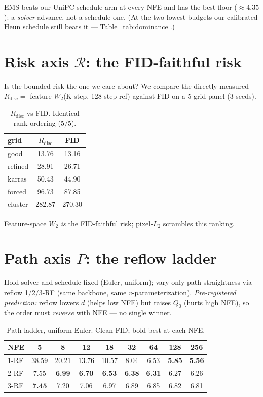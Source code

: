 \documentclass[11pt]{article}
\newcommand{\R}{\mathcal R}
\begin{document}
\noindent EMS beats our UniPC-schedule arm at every NFE and has the best floor
($\approx4.35$): a \emph{solver} advance, not a schedule one. (At the two
lowest budgets our calibrated Heun schedule still beats it ---
Table~\ref{tab:dominance}.)

\section{Risk axis $\R$: the FID-faithful risk}
\label{sec:risk}
Is the bounded risk the one we care about? We compare the directly-measured
$R_{\mathrm{disc}}=$ feature-$W_2$(K-step, 128-step ref) against FID on a
5-grid panel (3 seeds).

\begin{table}[h]\centering
\caption{$R_{\mathrm{disc}}$ vs FID. Identical rank ordering ($5/5$).}
\label{tab:risk}
\begin{tabular}{lcc}
\toprule
grid & $R_{\mathrm{disc}}$ & FID\\
\midrule
good    & 13.76  & 13.16\\
refined & 28.91  & 26.71\\
karras  & 50.43  & 44.90\\
forced  & 96.73  & 87.85\\
cluster & 282.87 & 270.30\\
\bottomrule
\end{tabular}
\end{table}

\noindent Feature-space $W_2$ \emph{is} the FID-faithful risk; pixel-$L_2$
scrambles this ranking.

\section{Path axis $P$: the reflow ladder}
\label{sec:path}
Hold solver and schedule fixed (Euler, uniform); vary only path straightness
via reflow 1/2/3-RF (same backbone, same $v$-parameterization). \emph{Pre-registered
prediction:} reflow lowers $d$ (helps low NFE) but raises $Q_0$ (hurts high
NFE), so the order must \emph{reverse} with NFE --- no single winner.

\begin{table}[h]\centering
\caption{Path ladder, uniform Euler. Clean-FID; bold best at each NFE.}
\label{tab:path}
\begin{tabular}{lcccccccc}
\toprule
NFE & 5 & 8 & 12 & 18 & 32 & 64 & 128 & 256\\
\midrule
1-RF & 38.59 & 20.21 & 13.76 & 10.57 & 8.04 & 6.53 & \textbf{5.85} & \textbf{5.56}\\
2-RF & 7.55 & \textbf{6.99} & \textbf{6.70} & \textbf{6.53} & \textbf{6.38} & \textbf{6.31} & 6.27 & 6.26\\
3-RF & \textbf{7.45} & 7.20 & 7.06 & 6.97 & 6.89 & 6.85 & 6.82 & 6.81\\
\bottomrule
\end{tabular}
\end{table}
\end{document}

